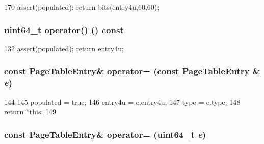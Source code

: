 \begin{DoxyCode}
170 { assert(populated); return bits(entry4u,60,60); }
\end{DoxyCode}
\hypertarget{classSparcISA_1_1PageTableEntry_a6d017c2a4bca6a40f6f3a6db95ccaf67}{
\subsubsection[{operator()}]{\setlength{\rightskip}{0pt plus 5cm}uint64\_\-t operator() () const}}
\label{classSparcISA_1_1PageTableEntry_a6d017c2a4bca6a40f6f3a6db95ccaf67}



\begin{DoxyCode}
132 { assert(populated); return entry4u; }
\end{DoxyCode}
\hypertarget{classSparcISA_1_1PageTableEntry_a3dc2db6c9f4ed3f6e9a5b199307a78e0}{
\subsubsection[{operator=}]{\setlength{\rightskip}{0pt plus 5cm}const {\bf PageTableEntry}\& operator= (const {\bf PageTableEntry} \& {\em e})}}
\label{classSparcISA_1_1PageTableEntry_a3dc2db6c9f4ed3f6e9a5b199307a78e0}



\begin{DoxyCode}
144     {
145         populated = true;
146         entry4u = e.entry4u;
147         type = e.type;
148         return *this;
149     }
\end{DoxyCode}
\hypertarget{classSparcISA_1_1PageTableEntry_aa0ab0fbd3211d9dbc19476a3f0bb0ab8}{
\subsubsection[{operator=}]{\setlength{\rightskip}{0pt plus 5cm}const {\bf PageTableEntry}\& operator= (uint64\_\-t {\em e})}}
\label{classSparcISA_1_1PageTableEntry_aa0ab0fbd3211d9dbc19476a3f0bb0ab8}



